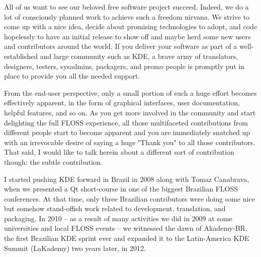 

\noindent{}All of us want to see our beloved free software project succeed. Indeed, we do a lot of consciously planned work to achieve such a freedom nirvana. We strive to come up with a nice idea, decide about promising technologies to adopt, and code hopelessly to have an initial release to show off and maybe herd some new users and contributors around the world. If you deliver your software as part of a well-established and large community such as KDE, a brave army of translators, designers, testers, sysadmins, packagers, and promo people is promptly put in place to provide you all the needed support.

From the end-user perspective, only a small portion of such a huge effort becomes effectively apparent, in the form of graphical interfaces, user documentation, helpful features, and so on. As you get more involved in the community and start delighting the full FLOSS experience, all those multifaceted contributions from different people start to become apparent and you are immediately snatched up with an irrevocable desire of saying a huge "Thank you" to all those contributors. That said, I would like to talk herein about a different sort of contribution though: the subtle contribution.

I started pushing KDE forward in Brazil in 2008 along with Tomaz Canabrava, when we presented a Qt short-course in one of the biggest Brazilian FLOSS conferences. At that time, only three Brazilian contributors were doing some nice but somehow stand-offish work related to development, translation, and packaging. In 2010 -- as a result of many activities we did in 2009 at some universities and local FLOSS events -- we witnessed the dawn of Akademy-BR, the first Brazilian KDE sprint ever and expanded it to the Latin-America KDE Summit (LaKademy) two years later, in 2012.

